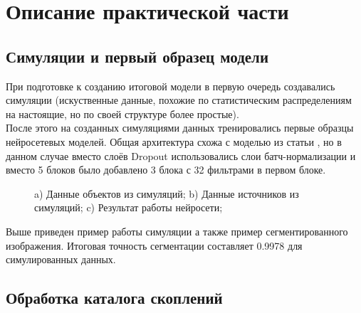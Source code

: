 \chapter{Описание практической части}
\label{cha:ch_5}

\section{Симуляции и первый образец модели}

При подготовке к созданию итоговой модели в первую очередь создавались симуляции (искуственные 
данные, похожие по статистическим распределениям на настоящие, но по своей структуре более простые). \\

После этого на созданных симуляциями данных тренировались первые образцы нейросетевых моделей. 
Общая архитектура схожа с моделью из статьи \cite{Bonjean}, но в данном случае вместо слоёв Dropout 
использовались слои батч-нормализации и вместо 5 блоков было добавлено 3 блока с 32 фильтрами в 
первом блоке. \\

\begin{figure}
	\begin{minipage}[h]{0.32\linewidth}
	\end{minipage}
	\begin{minipage}[h]{0.32\linewidth}
	\end{minipage}
	\begin{minipage}[h]{0.32\linewidth}
	\end{minipage}

	\caption{a) Данные объектов из симуляций; b) Данные источников из симуляций; 
		c) Результат работы нейросети;}
\end{figure}

Выше приведен пример работы симуляции а также пример сегментированного изображения. Итоговая точность 
сегментации составляет 0.9978 для симулированных данных.\\

\section{Обработка каталога скоплений}

